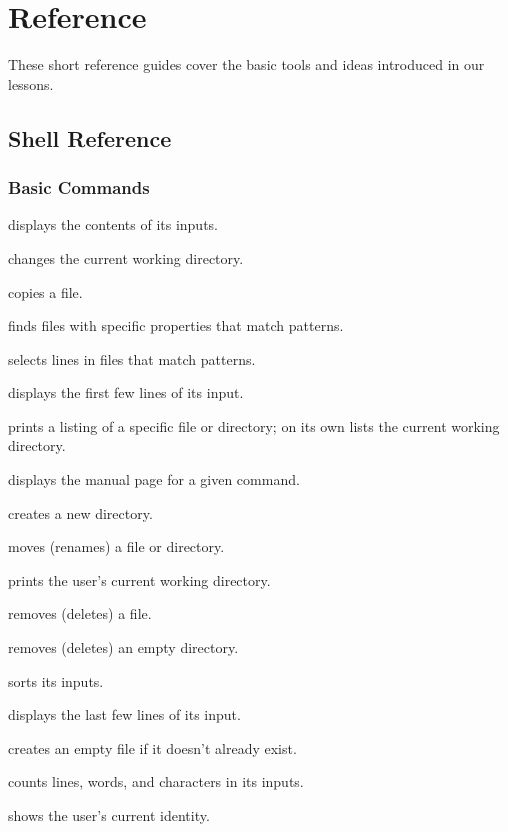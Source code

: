 \chapter{Reference}\label{s:reference}

These short reference guides cover the basic tools and ideas introduced
in our lessons.

\section{Shell Reference}

\subsection*{Basic Commands}

\begin{swcitemize}
\item
   displays the contents of its inputs.
\item
   changes the current working directory.
\item
   copies a file.
\item
   finds files with specific properties that match
  patterns.
\item
   selects lines in files that match patterns.
\item
   displays the first few lines of its input.
\item
   prints a listing of a specific file or directory;
   on its own lists the current working directory.
\item
   displays the manual page for a given command.
\item
   creates a new directory.
\item
   moves (renames) a file or directory.
\item
   prints the user's current working directory.
\item
   removes (deletes) a file.
\item
   removes (deletes) an empty directory.
\item
   sorts its inputs.
\item
   displays the last few lines of its input.
\item
   creates an empty file if it doesn't already exist.
\item
   counts lines, words, and characters in its inputs.
\item
   shows the user's current identity.
\end{swcitemize}

